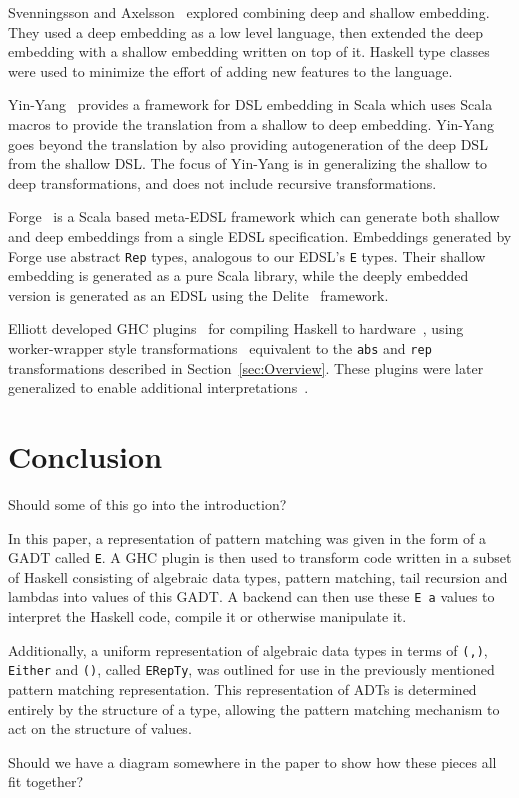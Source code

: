 \documentclass[runningheads, a4paper]{llncs}
\newenvironment{todo}
  {\ifthenelse{\isundefined{\showtodos}}{\comment}{\begin{tcolorbox}
    \textbf{TODO}:}}
  {\ifthenelse{\isundefined{\showtodos}}{\endcomment}{\end{tcolorbox}}
  }
\begin{document}
Svenningsson and Axelsson~\cite{Svenningsson:13:Combining}
explored combining deep and shallow embedding.  They used
a deep embedding as a low level language, then extended
the deep embedding with a shallow embedding written on top
of it. Haskell type classes were used to minimize the effort of adding
new features to the language.

Yin-Yang~\cite{Jovanovic:2014} provides a framework for DSL
embedding in Scala which uses Scala macros to provide the 
translation from a shallow to deep embedding.  Yin-Yang
goes beyond the translation by also providing autogeneration
of the deep DSL from the shallow DSL.  The focus of
Yin-Yang is in generalizing the shallow to deep transformations,
and does not include recursive transformations.

Forge~\cite{Sujeeth:2013} is a Scala based meta-EDSL framework
which can generate both shallow and deep embeddings from
a single EDSL specification.  Embeddings generated by Forge
use abstract \verb|Rep| types, analogous to our EDSL's 
\verb|E| types.  Their shallow embedding is generated
as a pure Scala library, while the deeply embedded version
is generated as an EDSL using the Delite~\cite{Sujeeth:2014}
framework.

Elliott developed GHC plugins~\cite{github:lambda-ccc}\cite{github:reification-rules}
for compiling Haskell to hardware~\cite{github:Elliott:Talk:2015},
using worker-wrapper style transformations~\cite{Gill:09:WW}
equivalent to the \verb|abs| and
\verb|rep| transformations described in Section~\ref{sec:Overview}. These plugins were later generalized to enable additional interpretations~\cite{Elliott:2017}.

\section{Conclusion}

\begin{todo}
Should some of this go into the introduction?
\end{todo}

In this paper, a representation of pattern matching was given in the form of a
GADT called \verb|E|. A GHC plugin is then used to transform code written in a
subset of Haskell consisting of algebraic data types, pattern matching, tail
recursion and lambdas into values of this GADT. A backend can then use these
\verb|E a| values to interpret the Haskell code, compile it or otherwise
manipulate it.

Additionally, a uniform representation of algebraic data types in terms of
\verb|(,)|, \verb|Either| and \verb|()|, called \verb|ERepTy|, was outlined for
use in the previously mentioned pattern matching representation. This
representation of ADTs is determined entirely by the structure of a type,
allowing the pattern matching mechanism to act on the structure of values.


\begin{todo}
Should we have a diagram somewhere in the paper to show how these pieces all fit together?
\end{todo}

\newpage


\end{document}
